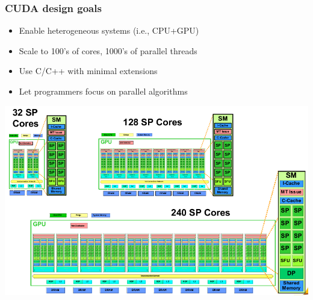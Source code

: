 \begin{frame}[fragile]
\frametitle{CUDA design goals}

\begin{itemize}
\item Enable heterogeneous systems (i.e., CPU+GPU)
\item Scale to 100's of cores, 1000's of parallel threads
\item Use C/C++ with minimal extensions
\item Let programmers focus on parallel algorithms
\end{itemize}

\begin{center}
\includegraphics[scale=0.38]{images/1.png}
\end{center}

\end{frame}
